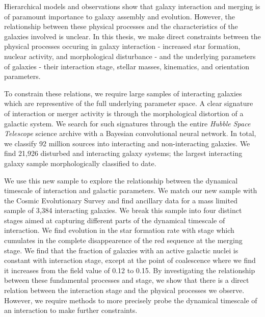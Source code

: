 

\begin{abstracts}        %
Hierarchical models and observations show that galaxy interaction and merging is of paramount importance to galaxy assembly and evolution. However, the relationship between these physical processes and the characteristics of the galaxies involved is unclear. In this thesis, we make direct constraints between the physical processes occuring in galaxy interaction - increased star formation, nuclear activity, and morphological disturbance - and the underlying parameters of galaxies - their interaction stage, stellar masses, kinematics, and orientation parameters. 

To constrain these relations, we require large samples of interacting galaxies which are representive of the full underlying parameter space. A clear signature of interaction or merger activity is through the morphological distortion of a galactic system. We search for such signatures through the entire \emph{Hubble Space Telescope} science archive with a Bayesian convolutional neural network. In total, we classify 92 million sources into interacting and non-interacting galaxies. We find 21,926 disturbed and interacting galaxy systems; the largest interacting galaxy sample morphologically classified to date. 

We use this new sample to explore the relationship between the dynamical timescale of interaction and galactic parameters. We match our new sample with the Cosmic Evolutionary Survey and find ancillary data for a mass limited sample of 3,384 interacting galaxies. We break this sample into four distinct stages aimed at capturing different parts of the dynamical timescale of interaction. We find evolution in the star formation rate with stage which cumulates in the complete disappearence of the red sequence at the merging stage. We find that the fraction of galaxies with an active galactic nuclei is constant with interaction stage, except at the point of coalescence where we find it increases from the field value of 0.12 to 0.15. By investigating the relationship between these fundamental processes and stage, we show that there is a direct relation between the interaction stage and the physical processes we observe. However, we require methods to more precisely probe the dynamical timescale of an interaction to make further constraints.


\end{abstracts}
